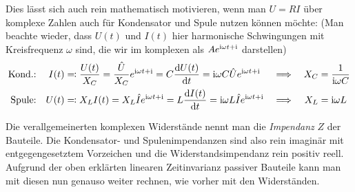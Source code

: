 Dies lässt sich auch rein mathematisch motivieren, wenn man $U = RI$ über komplexe Zahlen auch für Kondensator und Spule nutzen können möchte:
(Man beachte wieder, dass $U(t)$ und $I(t)$ hier harmonische Schwingungen mit Kreisfrequenz $\omega$ sind, die wir im komplexen als $A e^{\mathrm{i} \omega t + \mathrm{i}}$ darstellen)
\begin{align*}
    \text{Kond.:}&& I(t) &\eqqcolon 
        \frac{U(t)}{X_C} = \frac{\hat{U}}{X_C} e^{\mathrm{i} \omega t + \mathrm{i}} 
        = C \dv{U(t)}{t} = \mathrm{i} \omega C \hat{U} e^{\mathrm{i} \omega t + \mathrm{i}}
        & \implies && X_C &= \frac{1}{\mathrm{i} \omega C} \\
    \text{Spule:}&& U(t) &\eqqcolon X_LI(t) = X_L \hat{I} e^{\mathrm{i} \omega t + \mathrm{i}} 
        = L \dv{I(t)}{t} = \mathrm{i} \omega L\hat{I} e^{\mathrm{i} \omega t + \mathrm{i}}  & 
        \implies && X_L &= \mathrm{i} \omega L
\end{align*}


Die verallgemeinerten komplexen Widerstände nennt man die \textit{Impendanz} $Z$ der Bauteile.
Die Kondensator- und Spulenimpendanzen sind also rein imaginär mit entgegengesetztem Vorzeichen und die Widerstandsimpendanz rein positiv reell.
Aufgrund der oben erklärten linearen Zeitinvarianz passiver Bauteile kann man mit diesen nun genauso weiter rechnen, wie vorher mit den Widerständen.

